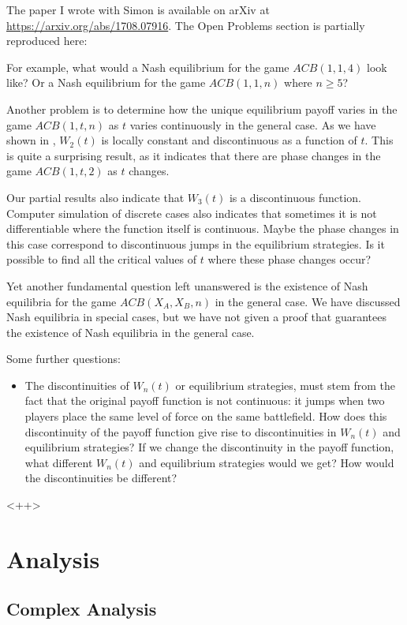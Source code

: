 \documentclass[12pt,oneside,reqno]{amsart}
\theoremstyle{definition}
\theoremstyle{remark}
\begin{document}
The paper I wrote with Simon is available on arXiv at \url{https://arxiv.org/abs/1708.07916}.
The Open Problems section is partially reproduced here:

For example, what would a Nash equilibrium for the game $ACB(1,1,4)$ look like? Or a Nash equilibrium for the game $ACB(1,1,n)$ where $n\ge 5$?

Another problem is to determine how the unique equilibrium payoff varies in the game $ACB(1,t,n)$ as $t$ varies continuously in the general case. As we have shown in , $W_2(t)$ is locally constant and discontinuous as a function of $t$. This is quite a surprising result, as it indicates that there are phase changes in the game $ACB(1,t,2)$ as $t$ changes.

Our partial results  also indicate that $W_3(t)$ is a discontinuous function. Computer simulation of discrete cases also indicates that sometimes it is not differentiable where the function itself is continuous. Maybe the phase changes in this case correspond to discontinuous jumps in the equilibrium strategies.
Is it possible to find all the critical values of $t$ where these phase changes occur?

Yet another fundamental question left unanswered is the existence of Nash equilibria for the game $ACB(X_A,X_B,n)$ in the general case. We have discussed Nash equilibria in special cases, but we have not given a proof that guarantees the existence of Nash equilibria in the general case.


Some further questions:
\begin{itemize}
  \item 
    The discontinuities of $W_n(t)$ or equilibrium strategies, must stem from the fact that the original payoff function is not continuous: it jumps when two players place the same level of force on the same battlefield. How does this discontinuity of the payoff function give rise to discontinuities in $W_n(t)$ and equilibrium strategies? If we change the discontinuity in the payoff function, what different $W_n(t)$ and equilibrium strategies would we get? How would the discontinuities be different?
\end{itemize}<++>
\section{Analysis}
\subsection{Complex Analysis}
\label{sec:ca}
\end{document}
